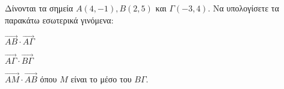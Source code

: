 Δίνονται τα σημεία $ Α(4,-1),Β(2,5) $ και $ \varGamma(-3,4) $. Να υπολογίσετε τα παρακάτω εσωτερικά γινόμενα:
\begin{multicols}{2}
\begin{alist}
\item $ \overrightarrow{AB}\cdot\overrightarrow{A\varGamma} $
\item $ \overrightarrow{A\varGamma}\cdot\overrightarrow{B\varGamma} $
\item $ \overrightarrow{AM}\cdot\overrightarrow{AB} $ όπου $ M $ είναι το μέσο του $ B\varGamma $.
\end{alist}
\end{multicols}

